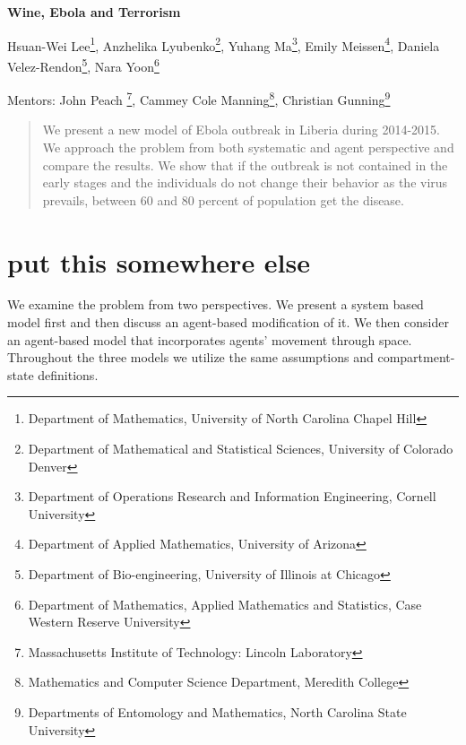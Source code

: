 \documentclass[10pt]{article}
\begin{document}
 

\centerline{\large \bf Wine, Ebola and Terrorism}

\vspace{.1truein}

\def\thefootnote{\arabic{footnote}}
\begin{center}
  Hsuan-Wei Lee\footnote{Department of Mathematics, University of North Carolina Chapel Hill},
  Anzhelika Lyubenko\footnote{Department of Mathematical and Statistical Sciences, University of Colorado Denver},
  Yuhang Ma\footnote{Department of Operations Research and Information Engineering, Cornell University},
  Emily Meissen\footnote{Department of Applied Mathematics, University of Arizona},
  Daniela Velez-Rendon\footnote{Department of Bio-engineering, University of Illinois at Chicago},
    Nara Yoon\footnote{
Department of Mathematics, Applied Mathematics and Statistics, Case Western Reserve University}
\end{center}


\begin{center}
Mentors: John Peach \footnote{Massachusetts Institute of Technology: Lincoln Laboratory}, Cammey Cole Manning\footnote{Mathematics and Computer Science Department, Meredith College},
Christian Gunning\footnote{Departments of Entomology and Mathematics, North Carolina State University}
\end{center}

\begin{abstract}
\noindent We present a new model of Ebola outbreak in Liberia during 2014-2015. We approach the problem from both systematic and agent perspective and compare the results. We show that if the outbreak is not contained in the early stages and the individuals do not change their behavior as the virus prevails, between 60 and 80 percent of population get the disease. 
\end{abstract}

\tableofcontents

\section{put this somewhere else}
We examine the problem from two perspectives. We present a system based model first and then discuss an agent-based modification of it. We then consider an agent-based model that incorporates agents' movement through space. Throughout the three models we utilize the same assumptions and compartment-state definitions. 
\end{document}
